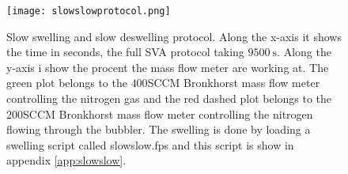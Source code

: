 \documentclass[MasterThesisMain.tex]{subfiles}
\begin{document}
\begin{figure}
\centering
\texttt{[image: slowslowprotocol.png]}
\caption{Slow swelling and slow deswelling protocol. Along the x-axis it shows the time in seconds, the full SVA protocol taking $\SI{9500}{\second}$. Along the y-axis i show the procent the mass flow meter are working at. The green plot belongs to the $400$SCCM Bronkhorst mass flow meter controlling the nitrogen gas and the red dashed plot belongs to the $200$SCCM Bronkhorst mass flow meter controlling the nitrogen flowing through the bubbler. The swelling is done by loading a swelling script called slowslow.fps and this script is show in appendix \ref{app:slowslow}.}
\label{fig:slowslow}
\end{figure}
   
\end{document}
